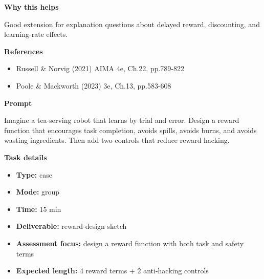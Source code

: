 \documentclass[11pt]{article}
\begin{document}
\begin{tcolorbox}[colback=white,colframe=MidnightBlue,title={Q4 Stretch Extension},fonttitle=\bfseries,breakable]
{\large\bfseries\color{MidnightBlue} Why this helps}\par\medskip
Good extension for explanation questions about delayed reward, discounting, and learning-rate effects.

{\large\bfseries\color{MidnightBlue} References}\par\medskip
\begin{itemize}\item Russell \& Norvig (2021) AIMA 4e, Ch.22, pp.789-822
\item Poole \& Mackworth (2023) 3e, Ch.13, pp.583-608\end{itemize}
\end{tcolorbox}

\begin{tcolorbox}[colback=white,colframe=MidnightBlue,title={Q5 Collaborative Mini-Case},fonttitle=\bfseries,breakable]
\begin{center}
\end{center}

{\large\bfseries\color{MidnightBlue} Prompt}\par\medskip
Imagine a tea-serving robot that learns by trial and error. Design a reward function that encourages task completion, avoids spills, avoids burns, and avoids wasting ingredients. Then add two controls that reduce reward hacking.

{\large\bfseries\color{MidnightBlue} Task details}\par\medskip
\begin{itemize}\item \textbf{Type:} case
\item \textbf{Mode:} group
\item \textbf{Time:} 15 min
\item \textbf{Deliverable:} reward-design sketch
\item \textbf{Assessment focus:} design a reward function with both task and safety terms
\item \textbf{Expected length:} 4 reward terms + 2 anti-hacking controls\end{itemize}


\end{tcolorbox}
\end{document}
